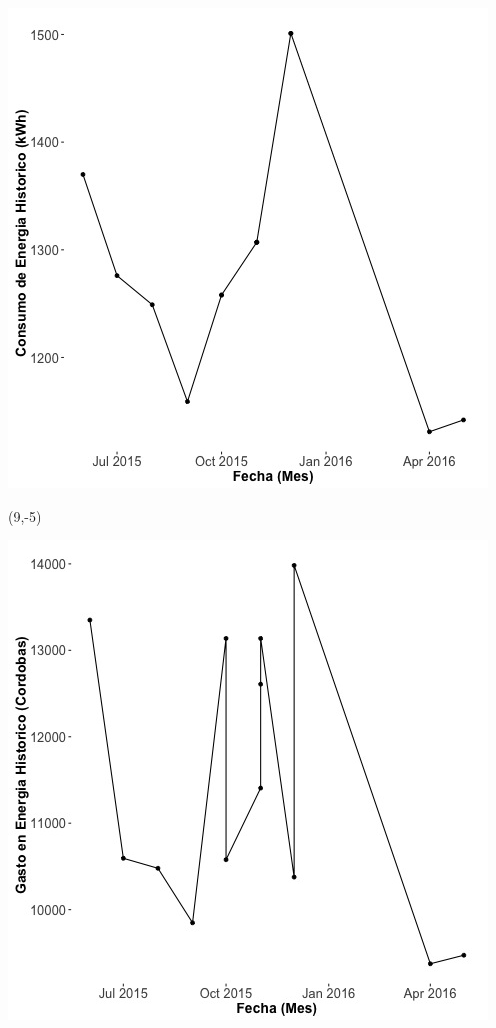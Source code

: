 \documentclass{article}\usepackage[]{graphicx}\usepackage[]{color}
\newenvironment{knitrout}{}{} %
\begin{document}
\begin{knitrout}
\color{fgcolor}
\includegraphics[scale=0.65]{figure/A26_historico_energia} 
\end{knitrout}

 \begin{textblock}{1}(9,-5)
\begin{minipage}{20em}
\begingroup

\endgroup
\end{minipage}
\end{textblock}

\begin{knitrout}
\color{fgcolor}
\includegraphics[scale=0.65]{figure/A26_historico_cordobas} 
\end{knitrout}
\end{document}
